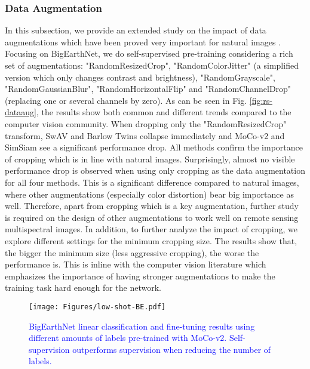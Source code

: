 \documentclass[lettersize,journal]{IEEEtran}
\begin{document}
\subsubsection{Data Augmentation}
In this subsection, we provide an extended study on the impact of data augmentations which have been proved very important for natural images \cite{chen2020simple}. Focusing on BigEarthNet, we do self-supervised pre-training considering a rich set of augmentations: "RandomResizedCrop", "RandomColorJitter" (a simplified version which only changes contrast and brightness), "RandomGrayscale", "RandomGaussianBlur", "RandomHorizontalFlip" and "RandomChannelDrop" (replacing one or several channels by zero). As can be seen in Fig. \ref{fig:rs-dataaug}, the results show both common and different trends compared to the computer vision community. When dropping only the "RandomResizedCrop" transform, SwAV and Barlow Twins collapse immediately and MoCo-v2 and SimSiam see a significant performance drop. All methods confirm the importance of cropping which is in line with natural images. Surprisingly, almost no visible performance drop is observed when using only cropping as the data augmentation for all four methods. This is a significant difference compared to natural images, where other augmentations (especially color distortion) bear big importance as well. Therefore, apart from cropping which is a key augmentation, further study is required on the design of other augmentations to work well on remote sensing multispectral images. In addition, to further analyze the impact of cropping, we explore different settings for the minimum cropping size. The results show that, the bigger the minimum size (less aggressive cropping), the worse the performance is. This is inline with the computer vision literature which emphasizes the importance of having stronger augmentations to make the training task hard enough for the network.






\begin{figure}
\centering
\texttt{[image: Figures/low-shot-BE.pdf]}
\caption[benchmark-SSL-RS-few-shot]{
\textcolor{blue}{
BigEarthNet linear classification and fine-tuning results using different amounts of labels pre-trained with MoCo-v2. Self-supervision outperforms supervision when reducing the number of labels.}
}
\label{fig:ssl-benchmark-fewshot}
\end{figure}
\end{document}
